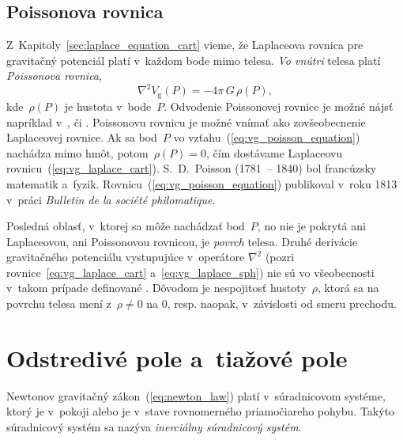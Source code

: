 \documentclass[a4paper,12pt]{book}
\newcommand{\gidx}{\mathrm g}
\begin{document}
\subsection{Poissonova rovnica}
\label{sec:poisson_equation}

Z~Kapitoly~\ref{sec:laplace_equation_cart} vieme, že Laplaceova rovnica pre
gravitačný potenciál platí v~každom bode mimo telesa.  \emph{Vo vnútri} telesa
platí \emph{Poissonova rovnica},
%
\begin{equation}
\label{eq:vg_poisson_equation}
\nabla^2 V_\gidx(P) = -4 \pi \, G \, \rho(P){,}
\end{equation}
%
kde~$\rho(P)$ je hustota v~bode~$P$.  Odvodenie Poissonovej rovnice je možné 
nájsť napríklad v~\textcite{MacMillan1930}, \textcite{Kellogg1967} či 
\textcite{SansoGeoidDetermination}.  Poissonovu rovnicu je možné vnímať ako 
zovšeobecnenie Laplaceovej rovnice.  Ak sa bod~$P$ vo 
vzťahu~(\ref{eq:vg_poisson_equation}) nachádza mimo hmôt, potom~$\rho(P) = 0$, 
čím dostávame Laplaceovu rovnicu~(\ref{eq:vg_laplace_cart}).  S.~D.~Poisson 
(1781~-- 1840) bol francúzsky matematik a~fyzik.  
Rovnicu~(\ref{eq:vg_poisson_equation}) publikoval v~roku 1813 v~práci 
\textit{Bulletin de la société philomatique}.

Posledná oblasť, v~ktorej sa môže nachádzať bod~$P$, no nie je pokrytá ani 
Laplaceovou, ani Poissonovou rovnicou, je \emph{povrch} telesa.  Druhé 
derivácie gravitačného potenciálu vystupujúce v~operátore $\nabla^2$ (pozri 
rovnice~\ref{eq:vg_laplace_cart} a~\ref{eq:vg_laplace_sph}) nie sú vo 
všeobecnosti v~takom prípade definované \parencite{Kellogg1967}.  Dôvodom je 
nespojitosť hustoty~$\rho$, ktorá sa na povrchu telesa mení z~$\rho \neq 0$ na 
0, resp. naopak, v~závislosti od smeru prechodu.






\section{Odstredivé pole a~tiažové pole}
\label{sec:centrifugal_gravity_field}

Newtonov gravitačný zákon~(\ref{eq:newton_law}) platí v~súradnicovom systéme,
ktorý je v~pokoji alebo je v~stave rovnomerného priamočiareho pohybu.  Takýto
súradnicový systém sa nazýva \emph{inerciálny súradnicový systém}.
\end{document}
